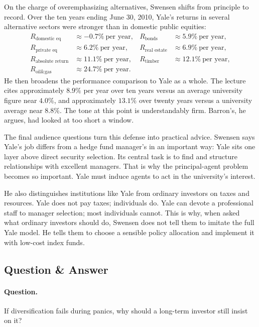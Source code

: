 On the charge of overemphasizing alternatives, Swensen shifts from principle to record. Over the ten years ending June 30, 2010, Yale's returns in several alternative sectors were stronger than in domestic public equities:
\begin{align}
R_{\text{domestic eq}} &\approx -0.7\%\ \text{per year},&
R_{\text{bonds}} &\approx 5.9\%\ \text{per year},\\
R_{\text{private eq}} &\approx 6.2\%\ \text{per year},&
R_{\text{real estate}} &\approx 6.9\%\ \text{per year},\\
R_{\text{absolute return}} &\approx 11.1\%\ \text{per year},&
R_{\text{timber}} &\approx 12.1\%\ \text{per year},\\
R_{\text{oil\&gas}} &\approx 24.7\%\ \text{per year}.&&
\end{align}
He then broadens the performance comparison to Yale as a whole. The lecture cites approximately \(8.9\%\) per year over ten years versus an average university figure near \(4.0\%\), and approximately \(13.1\%\) over twenty years versus a university average near \(8.8\%\). The tone at this point is understandably firm. Barron's, he argues, had looked at too short a window.

The final audience questions turn this defense into practical advice. Swensen says Yale's job differs from a hedge fund manager's in an important way: Yale sits one layer above direct security selection. Its central task is to find and structure relationships with excellent managers. That is why the principal-agent problem becomes so important. Yale must induce agents to act in the university's interest.

He also distinguishes institutions like Yale from ordinary investors on taxes and resources. Yale does not pay taxes; individuals do. Yale can devote a professional staff to manager selection; most individuals cannot. This is why, when asked what ordinary investors should do, Swensen does not tell them to imitate the full Yale model. He tells them to choose a sensible policy allocation and implement it with low-cost index funds.

\subsection{Question \& Answer}

\paragraph{Question.} If diversification fails during panics, why should a long-term investor still insist on it?

